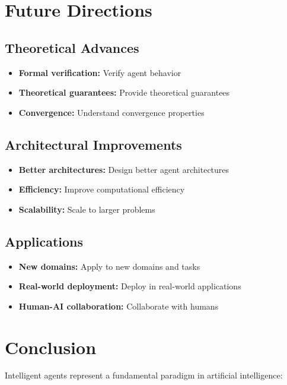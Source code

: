 \section{Future Directions}

\subsection{Theoretical Advances}

\begin{itemize}
    \item \textbf{Formal verification:} Verify agent behavior
    \item \textbf{Theoretical guarantees:} Provide theoretical guarantees
    \item \textbf{Convergence:} Understand convergence properties
\end{itemize}

\subsection{Architectural Improvements}

\begin{itemize}
    \item \textbf{Better architectures:} Design better agent architectures
    \item \textbf{Efficiency:} Improve computational efficiency
    \item \textbf{Scalability:} Scale to larger problems
\end{itemize}

\subsection{Applications}

\begin{itemize}
    \item \textbf{New domains:} Apply to new domains and tasks
    \item \textbf{Real-world deployment:} Deploy in real-world applications
    \item \textbf{Human-AI collaboration:} Collaborate with humans
\end{itemize}

\section{Conclusion}

Intelligent agents represent a fundamental paradigm in artificial intelligence:

